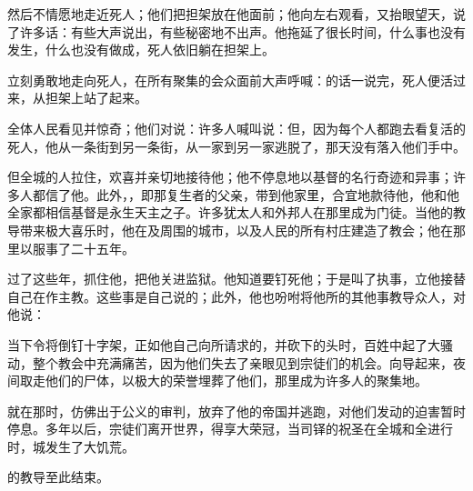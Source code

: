 然后不情愿地走近死人；他们把担架放在他面前；他向左右观看，又抬眼望天，说了许多话：有些大声说出，有些秘密地不出声。他拖延了很长时间，什么事也没有发生，什么也没有做成，死人依旧躺在担架上。\par

立刻勇敢地走向死人，在所有聚集的会众面前大声呼喊：的话一说完，死人便活过来，从担架上站了起来。\par

全体人民看见并惊奇；他们对说：许多人喊叫说：但，因为每个人都跑去看复活的死人，他从一条街到另一条街，从一家到另一家逃脱了，那天没有落入他们手中。\par

但全城的人拉住，欢喜并亲切地接待他；他不停息地以基督的名行奇迹和异事；许多人都信了他。此外，，即那复生者的父亲，带到他家里，合宜地款待他，他和他全家都相信基督是永生天主之子。许多犹太人和外邦人在那里成为门徒。当他的教导带来极大喜乐时，他在及周围的城市，以及人民的所有村庄建造了教会；他在那里以服事了二十五年。\par

过了这些年，抓住他，把他关进监狱。他知道要钉死他；于是叫了执事，立他接替自己在作主教。这些事是自己说的；此外，他也吩咐将他所的其他事教导众人，对他说：\par

当下令将倒钉十字架，正如他自己向所请求的，并砍下的头时，百姓中起了大骚动，整个教会中充满痛苦，因为他们失去了亲眼见到宗徒们的机会。向导起来，夜间取走他们的尸体，以极大的荣誉埋葬了他们，那里成为许多人的聚集地。\par

就在那时，仿佛出于公义的审判，放弃了他的帝国并逃跑，对他们发动的迫害暂时停息。多年以后，宗徒们离开世界，得享大荣冠，当司铎的祝圣在全城和全进行时，城发生了大饥荒。\par

的教导至此结束。\par

